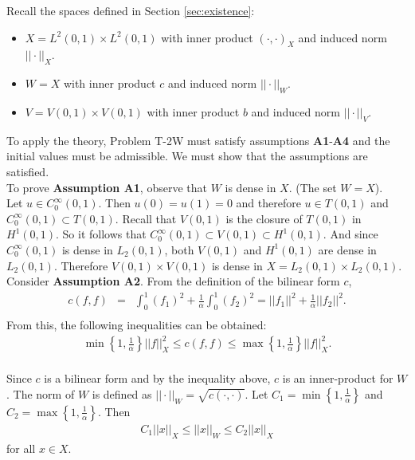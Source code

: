 \documentclass[../../main.tex]{subfiles}
\begin{document}
Recall the spaces defined in Section \ref{sec:existence}:
\begin{itemize}
	\item[] $X = L^2(0,1)\times L^2(0,1)$ with inner product $(\cdot,\cdot)_X$ and induced norm $||\cdot||_X$.
	\item[] $W = X$ with inner product $c$ and induced norm $||\cdot||_W$.
	\item[] $V  = V(0,1)\times V(0,1)$ with inner product $b$ and induced norm $||\cdot||_V$.
\end{itemize}

To apply the theory, Problem T-2W must satisfy assumptions \textbf{A1}-\textbf{A4} and the initial values must be admissible. We must show that the assumptions are satisfied.\\

To prove \textbf{Assumption A1}, observe that $W$ is dense in $X$. (The set $W = X$).\\

Let $u \in C_0^\infty(0,1)$. Then $u(0) = u(1) = 0$ and therefore $u \in T(0,1)$ and $C_0^\infty(0,1) \subset T(0,1)$. Recall that $V(0,1)$ is the closure of $T(0,1)$ in $H^1(0,1)$. So it follows that $C_0^\infty(0,1) \subset V(0,1) \subset H^1(0,1)$. And since $C_0^\infty(0,1)$ is dense in $L_2(0,1)$, both $V(0,1)$ and $H^1(0,1)$ are dense in $L_2(0,1)$. Therefore $V(0,1)\times V(0,1)$ is dense in $X = L_2(0,1) \times L_2(0,1)$.\\

Consider \textbf{Assumption A2}. From the definition of the bilinear form $c$,
\begin{eqnarray*}
	c(f,f) & = & \int_0^1  (f_1)^2 + \frac{1}{\alpha}\int_0^1  (f_2)^2 = ||f_1||^2 + \frac{1}{\alpha}||f_2||^2.\\
\end{eqnarray*}
From this, the following inequalities can be obtained:
\begin{eqnarray*}
	\min\left\{1, \frac{1}{\alpha}\right\} ||f||_{X}^2 \leq	c(f,f)	\leq \max\left\{1, \frac{1}{\alpha}\right\} ||f||_{X}^2.\\
\end{eqnarray*}

Since $c$ is a bilinear form and by the inequality above, $c$ is an inner-product for $W$. The norm of $W$ is defined as $||\cdot||_W = \sqrt{c(\cdot,\cdot)}$. Let $C_1 = \min\left\{1, \frac{1}{\alpha}\right\}$ and $C_2 = \max\left\{1, \frac{1}{\alpha}\right\}$. Then
\begin{eqnarray}
	C_1||x||_X \leq ||x||_W \leq C_2||x||_X \label{C}
\end{eqnarray} for all $x \in X$.\\
\end{document}
